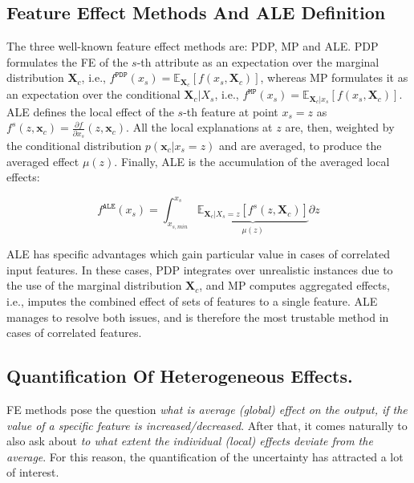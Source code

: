 \documentclass[twoside]{article}
\newcommand{\xc}{\mathbf{x}_c}
\newcommand{\Xcb}{\mathbf{X}_c}
\begin{document}
\subsection{Feature Effect Methods And ALE Definition}
\label{sec:feat-effect-meth}

The three well-known feature effect methods are: PDP, MP and ALE. PDP
formulates the FE of the \(s\)-th attribute as an expectation over the
marginal distribution \(\mathbf{X}_c\), i.e.,
\(f^{\mathtt{PDP}}(x_s) =
\mathbb{E}_{\mathbf{X}_c}[f(x_s,\mathbf{X}_c)]\), whereas MP
formulates it as an expectation over the conditional
\(\mathbf{X}_c|X_s\), i.e.,
\(f^{\mathtt{MP}}(x_s) = \mathbb{E}_{\mathbf{X}_c|x_s}[f(x_s,
\mathbf{X}_c)]\). ALE defines the local effect of the \(s\)-th feature
at point \(x_s = z\) as \(f^s(z, \xc) = \frac{\partial f}{\partial x_s} (z, \xc)\). All the
local explanations at \(z\) are, then, weighted by the conditional
distribution \(p(\xc|x_s=z)\) and are averaged, to produce the
averaged effect \(\mu(z)\). Finally, ALE is the accumulation of the
averaged local effects:

\begin{equation}
  \label{eq:ALE}
  f^{\mathtt{ALE}}(x_s) = \int_{x_{s,min}}^{x_s} \underbrace{\mathbb{E}_{\Xcb|X_s=z}\left [f^s (z, \Xcb)\right ]}_{\mu(z)} \partial z
\end{equation}


ALE has specific advantages which gain particular value in cases of
correlated input features. In these cases, PDP integrates over
unrealistic instances due to the use of the marginal distribution
\(\mathbf{X}_c \), and MP computes aggregated effects, i.e., imputes
the combined effect of sets of features to a single feature. ALE
manages to resolve both issues, and is therefore the most trustable
method in cases of correlated features.

\subsection{Quantification Of Heterogeneous Effects.}
\label{sec:quant-heter-effects}

FE methods pose the question \textit{what is average (global) effect
  on the output, if the value of a specific feature is
  increased/decreased}. After that, it comes naturally to also ask
about \textit{to what extent the individual (local) effects deviate
  from the average}. For this reason, the quantification of the
uncertainty has attracted a lot of interest.
\end{document}
